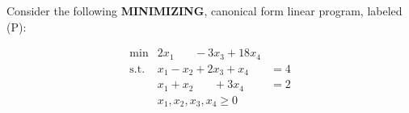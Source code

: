 
Consider the following {\bf MINIMIZING}, canonical form linear program, labeled (P):
\vspace{-2mm}

\begin{equation}
  \label{eq:1}
  \tag{P}
  \begin{array}{lll}
    \min & 2 x_1 \phantom{+ x_2} - 3 x_3 + 18 x_4 & \\
    \mbox{s.t.} & x_1 -  x_2 + 2 x_3 + x_4 & = 4 \\[1mm]
    & x_1 + x_2 \phantom{+ x_3} + 3 x_4 & = 2 \\
    & x_1, x_2, x_3, x_4 \geq 0 &
  \end{array}
\end{equation}




